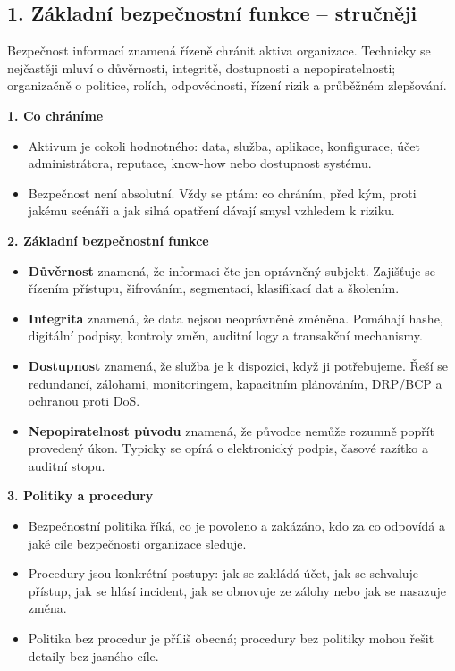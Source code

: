 
\subsection*{1. Základní bezpečnostní funkce -- stručněji}
Bezpečnost informací znamená řízeně chránit aktiva organizace. Technicky se nejčastěji mluví o důvěrnosti, integritě, dostupnosti a nepopiratelnosti; organizačně o politice, rolích, odpovědnosti, řízení rizik a průběžném zlepšování.

\textbf{1. Co chráníme}
\begin{itemize}
  \item Aktivum je cokoli hodnotného: data, služba, aplikace, konfigurace, účet administrátora, reputace, know-how nebo dostupnost systému.
  \item Bezpečnost není absolutní. Vždy se ptám: co chráním, před kým, proti jakému scénáři a jak silná opatření dávají smysl vzhledem k riziku.
\end{itemize}

\textbf{2. Základní bezpečnostní funkce}
\begin{itemize}
  \item \textbf{Důvěrnost} znamená, že informaci čte jen oprávněný subjekt. Zajišťuje se řízením přístupu, šifrováním, segmentací, klasifikací dat a školením.
  \item \textbf{Integrita} znamená, že data nejsou neoprávněně změněna. Pomáhají hashe, digitální podpisy, kontroly změn, auditní logy a transakční mechanismy.
  \item \textbf{Dostupnost} znamená, že služba je k dispozici, když ji potřebujeme. Řeší se redundancí, zálohami, monitoringem, kapacitním plánováním, DRP/BCP a ochranou proti DoS.
  \item \textbf{Nepopiratelnost původu} znamená, že původce nemůže rozumně popřít provedený úkon. Typicky se opírá o elektronický podpis, časové razítko a auditní stopu.
\end{itemize}

\textbf{3. Politiky a procedury}
\begin{itemize}
  \item Bezpečnostní politika říká, co je povoleno a zakázáno, kdo za co odpovídá a jaké cíle bezpečnosti organizace sleduje.
  \item Procedury jsou konkrétní postupy: jak se zakládá účet, jak se schvaluje přístup, jak se hlásí incident, jak se obnovuje ze zálohy nebo jak se nasazuje změna.
  \item Politika bez procedur je příliš obecná; procedury bez politiky mohou řešit detaily bez jasného cíle.
\end{itemize}

